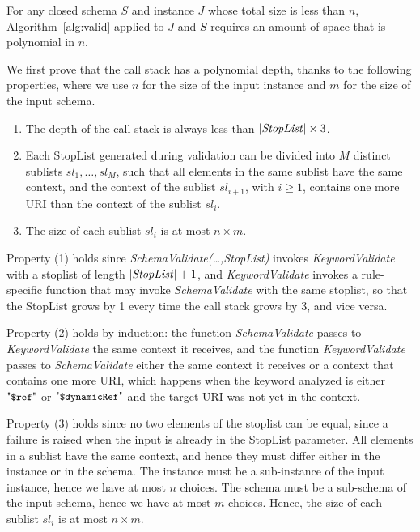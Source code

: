 \begin{theoremrep}
For any closed schema $S$ and instance $J$ whose total size is less than $n$, Algorithm~\ref{alg:valid}
applied to $J$ and $S$ requires an amount of space that is polynomial in $n$.
\end{theoremrep}

\begin{appendixproof}
We first prove that the call stack has a polynomial depth, thanks to the following properties,
where we use $n$ for the size of the input instance and $m$ for the size of the input schema.
\begin{enumerate}
\item The depth of the call stack is always less than $|\mathit{StopList}|\times 3$.
\item Each StopList generated during validation can be divided into $M$ distinct sublists $sl_1,\ldots,sl_M$, such that all elements in the same sublist have the same context, and the context of the sublist $sl_{i+1}$, with $i \geq 1$, contains one more URI than the context of the sublist $sl_{i}$.
\item The size of each sublist $sl_{i}$ is at most $n\times m$.
\end{enumerate}

Property (1) holds since \emph{SchemaValidate(\ldots,StopList)} invokes  \emph{KeywordValidate} with a stoplist
of length $|\mathit{StopList}|+1$, and \emph{KeywordValidate} invokes a rule-specific function
that may invoke \emph{SchemaValidate} with the same stoplist,
so that the StopList grows by 1 every time the call stack grows by 3, and vice versa.

Property (2) holds by induction: the function  \emph{SchemaValidate} passes to \emph{KeywordValidate} the same context it receives, and 
the function  \emph{KeywordValidate} passes to \emph{SchemaValidate} either the same context it receives or a context that contains one more URI, which happens when the keyword analyzed is either $\qdref$ or $\qddref$ and the target URI was not yet in the context.
 
 Property (3) holds since no two elements of the stoplist can be equal, since a failure is raised when the input is already in the StopList parameter. All elements in a sublist have the same context, and hence they must differ either in the instance or in the schema.
 The instance must be a sub-instance of the input instance, hence we have at most $n$ choices. 
 The schema must be a sub-schema of the input schema, hence we have at most $m$ choices. 
 Hence, the size of each sublist $sl_{i}$ is at most $n\times m$.
 

\end{appendixproof}
